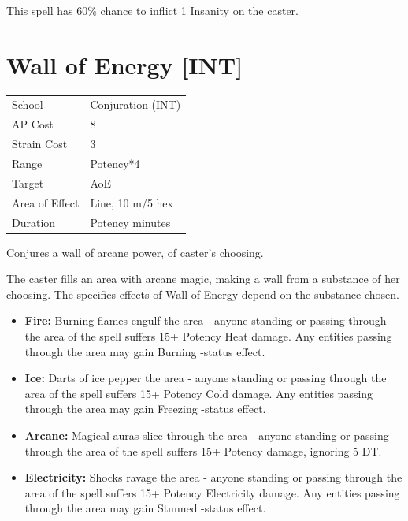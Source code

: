 \documentclass[11pt,a4paper,twocolumn]{book}
\begin{document}
This spell has 60\% chance to inflict 1 Insanity on the caster.


\section*{Wall of Energy [INT]}
{
	\begin{tabu} to 75mm{| X[l,4] | X[l,7] |}
		\hline
		School 			& Conjuration (INT) 			\\
        AP Cost	      	& 8 							\\
        Strain Cost     & 3 							\\
        Range     		& Potency*4 					\\
        Target      	& AoE							\\
        Area of Effect  & Line, 10 m/5 hex 	 			\\
        Duration     	& Potency minutes				\\ \hline
	\end{tabu}
		
}

\medskip

Conjures a wall of arcane power, of caster's choosing.

The caster fills an area with arcane magic, making a wall from a substance of her choosing. The specifics effects of Wall of Energy depend on the substance chosen.
\begin{itemize}
\item \textbf{Fire:} Burning flames engulf the area - anyone standing or passing through the area of the spell suffers 15+ Potency Heat damage. Any entities passing through the area may gain Burning -status effect.
\item \textbf{Ice:} Darts of ice pepper the area - anyone standing or passing through the area of the spell suffers 15+ Potency Cold damage. Any entities passing through the area may gain Freezing -status effect.
\item \textbf{Arcane:} Magical auras slice through the area - anyone standing or passing through the area of the spell suffers 15+ Potency damage, ignoring 5 DT.
\item \textbf{Electricity:} Shocks ravage the area - anyone standing or passing through the area of the spell suffers 15+ Potency Electricity damage. Any entities passing through the area may gain Stunned -status effect.
\end{itemize}
\end{document}

